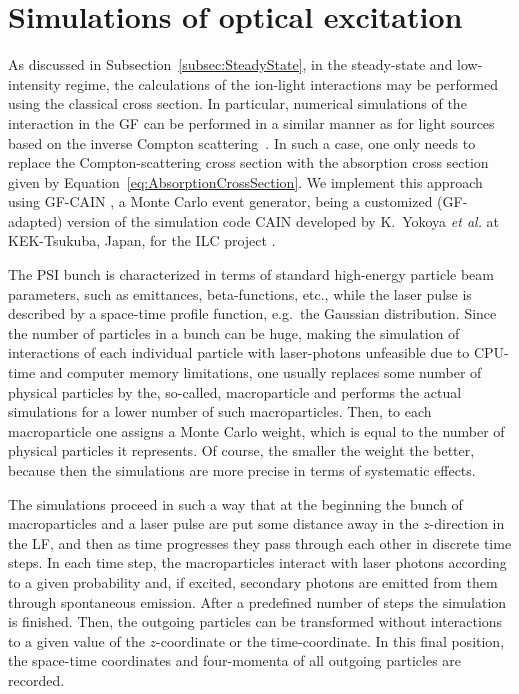 \section{Simulations of optical excitation}
\label{sec:MCsim}

As discussed in Subsection~\ref{subsec:SteadyState}, in the steady-state and low-intensity regime, the calculations of the ion-light interactions may be performed using the classical cross section. In particular, numerical simulations of the interaction in the GF can be performed in a similar manner as for light sources based on the inverse Compton scattering~\cite{Sprangle:1992zza}.  In such a case, one only needs to replace the Compton-scattering cross section with the absorption cross section given by Equation~\ref{eq:AbsorptionCrossSection}. We implement this approach using {\sf GF-CAIN} \cite{GF-CAIN}, a Monte Carlo event generator, being a customized (GF-adapted) version of the simulation code {\sf CAIN} \cite{CAIN} developed by K.\ Yokoya {\em et al.} at KEK-Tsukuba, Japan, for the ILC project \cite{ILC}. 

The PSI bunch is characterized in terms of standard high-energy particle beam parameters, such as emittances, beta-functions, etc., while the laser pulse is described by a space-time profile function, e.g.\ the Gaussian distribution.  Since the number of particles in a bunch can be huge, making the simulation of interactions of each individual particle with laser-photons unfeasible due to CPU-time and computer memory limitations, one usually replaces some number of physical particles by the, so-called, macroparticle and performs the actual simulations for a lower number of such macroparticles.  Then, to each macroparticle one assigns a Monte Carlo weight, which is equal to the number of physical particles  it represents.  Of course, the smaller the weight the better, because then the simulations are more precise in terms of systematic effects. 

The simulations proceed in such a way that at the beginning the bunch of macroparticles and a laser pulse are put some distance away in the $z$-direction in the LF, and then as time progresses they pass through each other in discrete time steps.  In each time step, the macroparticles interact with laser photons according to a given probability and, if excited, secondary photons are emitted from them through spontaneous emission.  After a predefined number of steps the simulation is finished.  Then, the outgoing particles can be transformed without interactions to a given value of the $z$-coordinate or the time-coordinate.  In this final position, the space-time coordinates and four-momenta of all outgoing particles are recorded. 

